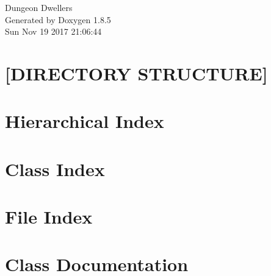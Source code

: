 \documentclass[twoside]{book}
\newcommand{\clearemptydoublepage}{%
  \newpage{\pagestyle{empty}\cleardoublepage}%
}
\begin{document}
\hypersetup{pageanchor=false}
\begin{titlepage}
\vspace*{7cm}
\begin{center}%
{\Large Dungeon Dwellers }\\
\vspace*{1cm}
{\large Generated by Doxygen 1.8.5}\\
\vspace*{0.5cm}
{\small Sun Nov 19 2017 21:06:44}\\
\end{center}
\end{titlepage}
\clearemptydoublepage
\tableofcontents
\clearemptydoublepage
{}
\hypersetup{pageanchor=true}

\chapter{\mbox{[}D\-I\-R\-E\-C\-T\-O\-R\-Y S\-T\-R\-U\-C\-T\-U\-R\-E\mbox{]}}
\label{md__home_rigt2720_Kodika_README}
\hypertarget{md__home_rigt2720_Kodika_README}{}

\chapter{Hierarchical Index}

\chapter{Class Index}

\chapter{File Index}

\chapter{Class Documentation}




















































\end{document}
